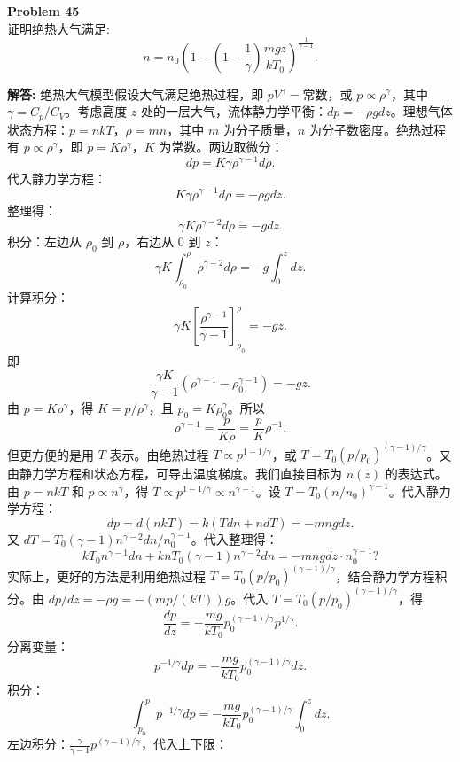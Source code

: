 \documentclass[12pt, a4paper, oneside]{ctexart}
\newenvironment{solution}{\par\noindent\textbf{解答:}\quad}{\par}
\begin{document}
\begin{mdframed}[backgroundcolor=gray!10, linewidth=0pt]
    \textbf{Problem 45} \\
    证明绝热大气满足:
    \[
    n = n_0 \left(1 - \left(1 - \frac{1}{\gamma}\right) \frac{m g z}{k T_0} \right)^{\frac{1}{\gamma-1}}.
    \]
\end{mdframed}
\begin{solution}
    绝热大气模型假设大气满足绝热过程，即 $p V^\gamma = \text{常数}$，或 $p \propto \rho^\gamma$，其中 $\gamma = C_p / C_V$。考虑高度 $z$ 处的一层大气，流体静力学平衡：$dp = -\rho g dz$。理想气体状态方程：$p = n k T$，$\rho = m n$，其中 $m$ 为分子质量，$n$ 为分子数密度。绝热过程有 $p \propto \rho^\gamma$，即 $p = K \rho^\gamma$，$K$ 为常数。两边取微分：
    \[
    dp = K \gamma \rho^{\gamma-1} d\rho.
    \]
    代入静力学方程：
    \[
    K \gamma \rho^{\gamma-1} d\rho = -\rho g dz.
    \]
    整理得：
    \[
    \gamma K \rho^{\gamma-2} d\rho = -g dz.
    \]
    积分：左边从 $\rho_0$ 到 $\rho$，右边从 $0$ 到 $z$：
    \[
    \gamma K \int_{\rho_0}^{\rho} \rho^{\gamma-2} d\rho = -g \int_0^z dz.
    \]
    计算积分：
    \[
    \gamma K \left[ \frac{\rho^{\gamma-1}}{\gamma-1} \right]_{\rho_0}^{\rho} = -g z.
    \]
    即
    \[
    \frac{\gamma K}{\gamma-1} (\rho^{\gamma-1} - \rho_0^{\gamma-1}) = -g z.
    \]
    由 $p = K \rho^\gamma$，得 $K = p / \rho^\gamma$，且 $p_0 = K \rho_0^\gamma$。所以
    \[
    \rho^{\gamma-1} = \frac{p}{K \rho} = \frac{p}{K} \rho^{-1}.
    \]
    但更方便的是用 $T$ 表示。由绝热过程 $T \propto p^{1-1/\gamma}$，或 $T = T_0 (p/p_0)^{(\gamma-1)/\gamma}$。又由静力学方程和状态方程，可导出温度梯度。我们直接目标为 $n(z)$ 的表达式。由 $p = n k T$ 和 $p \propto n^\gamma$，得 $T \propto p^{1-1/\gamma} \propto n^{\gamma-1}$。设 $T = T_0 (n/n_0)^{\gamma-1}$。代入静力学方程：
    \[
    dp = d(n k T) = k (T dn + n dT) = -m n g dz.
    \]
    又 $dT = T_0 (\gamma-1) n^{\gamma-2} dn / n_0^{\gamma-1}$。代入整理得：
    \[
    k T_0 n^{\gamma-1} dn + k n T_0 (\gamma-1) n^{\gamma-2} dn = -m n g dz \cdot n_0^{\gamma-1}? 
    \]
    实际上，更好的方法是利用绝热过程 $T = T_0 (p/p_0)^{(\gamma-1)/\gamma}$，结合静力学方程积分。由 $dp/dz = -\rho g = - (m p / (k T)) g$。代入 $T = T_0 (p/p_0)^{(\gamma-1)/\gamma}$，得
    \[
    \frac{dp}{dz} = -\frac{m g}{k T_0} p_0^{(\gamma-1)/\gamma} p^{1/\gamma}.
    \]
    分离变量：
    \[
    p^{-1/\gamma} dp = -\frac{m g}{k T_0} p_0^{(\gamma-1)/\gamma} dz.
    \]
    积分：
    \[
    \int_{p_0}^{p} p^{-1/\gamma} dp = -\frac{m g}{k T_0} p_0^{(\gamma-1)/\gamma} \int_0^z dz.
    \]
    左边积分：$\frac{\gamma}{\gamma-1} p^{(\gamma-1)/\gamma}$，代入上下限：

\end{solution}
\end{document}
